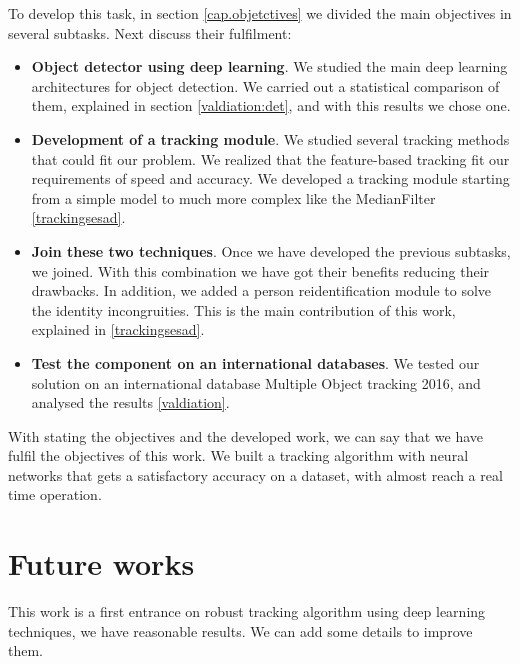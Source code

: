To develop this task, in section \ref{cap.objetctives} we divided the main objectives in several subtasks. Next discuss their fulfilment:
\begin{itemize}

\item \textbf{Object detector using deep learning}. We studied the main deep learning architectures for object detection. We carried out a statistical comparison of them, explained in section \ref{valdiation:det}, and with this results we chose one.


\item \textbf{Development of a tracking module}. We studied several tracking methods that could fit our problem. We realized that the feature-based tracking fit our requirements of speed and accuracy. We developed a tracking module starting from a simple model to much more complex like the MedianFilter \ref{trackingsesad}. 

\item \textbf{Join these two techniques}. Once we have developed the previous subtasks, we joined. With this combination we have got their benefits reducing their drawbacks. In addition, we added a person reidentification module to solve the identity incongruities. This is the main contribution of this work, explained in \ref{trackingsesad}.  

\item \textbf{Test the component on an international databases}. We tested our solution on an international database Multiple Object tracking 2016, and analysed the results \ref{valdiation}.


\end{itemize}

With stating the objectives and the developed work, we can say that we have fulfil the objectives of this work. We built a tracking algorithm with neural networks that gets a satisfactory accuracy on a dataset, with almost reach a real time operation.





\section{Future works}


This work is a first entrance on robust tracking algorithm using deep learning techniques, we have reasonable results. We can add some details to improve them.


